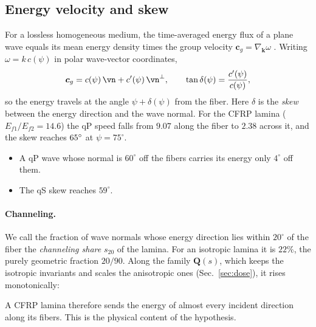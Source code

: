 \subsection{Energy velocity and skew}
For a lossless homogeneous medium, the time-averaged energy flux of a plane wave equals
its mean energy density times the group velocity $\bm c_g=\nabla_{\bm k}\omega$
\cite{auld}. Writing $\omega=k\,c(\psi)$ in polar wave-vector coordinates,
\begin{equation}
\bm c_g=c(\psi)\,\vn+c'(\psi)\,\vn^\perp,\qquad
\tan\delta(\psi)=\frac{c'(\psi)}{c(\psi)} ,
\label{eq:skew}
\end{equation}
so the energy travels at the angle $\psi+\delta(\psi)$ from the fiber. Here $\delta$ is
the \emph{skew} between the energy direction and the wave normal. For the CFRP lamina
($E_{f1}/E_{f2}=14.6$) the qP speed falls from $9.07$ along the fiber to $2.38$ across
it, and the skew reaches $65^\circ$ at $\psi=75^\circ$.
\begin{itemize}[itemsep=1pt]
\item A qP wave whose normal is $60^\circ$ off the fibers carries its energy only
$4^\circ$ off them.
\item The qS skew reaches $59^\circ$.
\end{itemize}

\paragraph{Channeling.} We call the fraction of wave normals whose energy direction lies
within $20^\circ$ of the fiber the \emph{channeling share} $s_{20}$ of the lamina. For
an isotropic lamina it is $22\%$, the purely geometric fraction $20/90$. Along the
family $\mathbf Q(s)$, which keeps the isotropic invariants and scales the anisotropic
ones (Sec.~\ref{sec:dose}), it rises monotonically:
\begin{center}\small
{}
\end{center}
A CFRP lamina therefore sends the energy of almost every incident direction along its
fibers. This is the physical content of the hypothesis.

